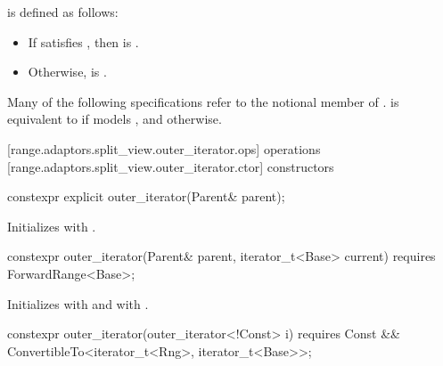 {\color{oldclr}
\pnum
{} is defined
as follows:
\begin{itemize}
\item If  satisfies ,
then  is .

\item Otherwise,  is .
\end{itemize}
} %

{\color{newclr}
\pnum
Many of the following specifications refer to the notional member
 of .
 is equivalent to  if 
models , and  otherwise.
} %

[range.adaptors.split_view.outer_iterator.ops]{ operations}
[range.adaptors.split_view.outer_iterator.ctor]{ constructors}

%
\begin{itemdecl}
constexpr explicit outer_iterator(Parent& parent);
\end{itemdecl}

\begin{itemdescr}
\pnum
\effects Initializes  with .
\end{itemdescr}

%
\begin{itemdecl}
constexpr outer_iterator(Parent& parent, iterator_t<Base> current)
  requires ForwardRange<Base>;
\end{itemdecl}

\begin{itemdescr}
\pnum
\effects Initializes  with 
and  with .
\end{itemdescr}

%
\begin{itemdecl}
constexpr outer_iterator(outer_iterator<!Const> i) requires Const &&
  ConvertibleTo<iterator_t<Rng>, iterator_t<Base>>;
\end{itemdecl}

